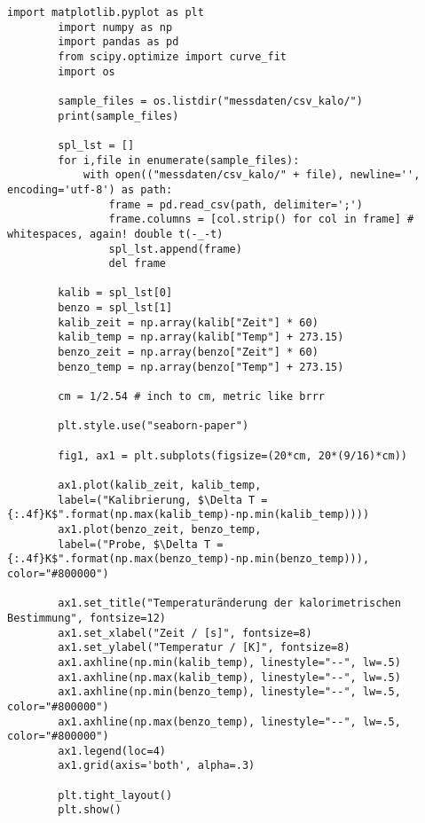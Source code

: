 	\begin{lstlisting}[style=python, caption={Zur Auswertung der kalorimetrischen Messung verwendeter Python-Code.}]
		import matplotlib.pyplot as plt
		import numpy as np
		import pandas as pd
		from scipy.optimize import curve_fit
		import os

		sample_files = os.listdir("messdaten/csv_kalo/")
		print(sample_files)

		spl_lst = []
		for i,file in enumerate(sample_files):
			with open(("messdaten/csv_kalo/" + file), newline='', encoding='utf-8') as path:
				frame = pd.read_csv(path, delimiter=';')
				frame.columns = [col.strip() for col in frame] # whitespaces, again! double t(-_-t)
				spl_lst.append(frame)
				del frame

		kalib = spl_lst[0]
		benzo = spl_lst[1]
		kalib_zeit = np.array(kalib["Zeit"] * 60)
		kalib_temp = np.array(kalib["Temp"] + 273.15)
		benzo_zeit = np.array(benzo["Zeit"] * 60)
		benzo_temp = np.array(benzo["Temp"] + 273.15)
		
		cm = 1/2.54 # inch to cm, metric like brrr

		plt.style.use("seaborn-paper")

		fig1, ax1 = plt.subplots(figsize=(20*cm, 20*(9/16)*cm))

		ax1.plot(kalib_zeit, kalib_temp,
		label=("Kalibrierung, $\Delta T = {:.4f}K$".format(np.max(kalib_temp)-np.min(kalib_temp))))
		ax1.plot(benzo_zeit, benzo_temp,
		label=("Probe, $\Delta T = {:.4f}K$".format(np.max(benzo_temp)-np.min(benzo_temp))), color="#800000")

		ax1.set_title("Temperaturänderung der kalorimetrischen Bestimmung", fontsize=12)
		ax1.set_xlabel("Zeit / [s]", fontsize=8)
		ax1.set_ylabel("Temperatur / [K]", fontsize=8)
		ax1.axhline(np.min(kalib_temp), linestyle="--", lw=.5)
		ax1.axhline(np.max(kalib_temp), linestyle="--", lw=.5)
		ax1.axhline(np.min(benzo_temp), linestyle="--", lw=.5, color="#800000")
		ax1.axhline(np.max(benzo_temp), linestyle="--", lw=.5, color="#800000")
		ax1.legend(loc=4)
		ax1.grid(axis='both', alpha=.3)

		plt.tight_layout()
		plt.show()
	\end{lstlisting}